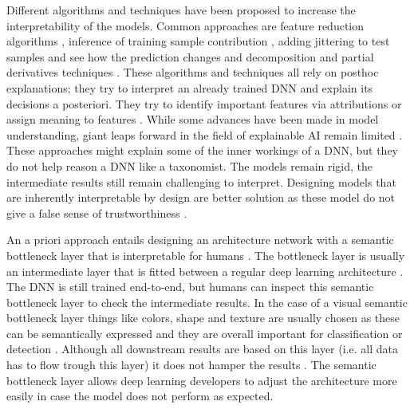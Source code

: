 \documentclass[a4paper, 12pt, oneside]{book} %
\begin{document}
Different algorithms and techniques have been proposed to increase the interpretability of the models.
Common approaches are feature reduction algorithms \autocite{ribeiro_why_2016}, inference of training sample contribution \autocite{koh_understanding_2020}, adding jittering to test samples and see how the prediction changes \autocite{li_understanding_2017} and decomposition and partial derivatives techniques \autocite{samek_explainable_2017}.
These algorithms and techniques all rely on posthoc explanations; they try to interpret an already trained DNN and explain its decisions a posteriori.
They try to identify important features via attributions \autocite{zintgraf_visualizing_2017, selvaraju_grad-cam_2017} or assign meaning to features \autocite{fleet_visualizing_2014}.
While some advances have been made in model understanding, giant leaps forward in the field of explainable AI remain limited \autocite{lipton_mythos_2017, li_interpretable_2021}.
These approaches might explain some of the inner workings of a DNN, but they do not help reason a DNN like a taxonomist.
The models remain rigid, the intermediate results still remain challenging to interpret.
Designing models that are inherently interpretable by design are better solution as these model do not give a false sense of trustworthiness \autocite{rudin_stop_2019}.

An a priori approach entails designing an architecture network with a semantic bottleneck layer that is interpretable for humans \autocite{bucher_semantic_2019}. 
The bottleneck layer is usually an intermediate layer that is fitted between a regular deep learning architecture \autocite{bucher_semantic_2019}.
The DNN is still trained end-to-end, but humans can inspect this semantic bottleneck layer to check the intermediate results.
In the case of a visual semantic bottleneck layer things like colors, shape and texture are usually chosen as these can be semantically expressed and they are overall important for classification or detection \autocite{yosinski_understanding_2015, fleet_visualizing_2014}.
Although all downstream results are based on this layer (i.e. all data has to flow trough this layer) it does not hamper the results \autocite{bucher_semantic_2019}.
The semantic bottleneck layer allows deep learning developers to adjust the architecture more easily in case the model does not perform as expected.
\end{document}
